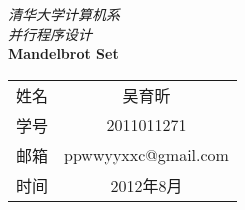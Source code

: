 
\newcommand{\HUGE}{\fontsize{29pt}{29pt}\selectfont} 
\renewcommand{\today}{\number\year 年 \number\month 月 \number\day 日}
\begin{titlepage} 


\phantom{Start!}

\vspace{-1.7cm} 

\begin{flushleft}

\emph{\Large 清华大学计算机系}\\[0.2cm]

\emph{\Large 并行程序设计}\\[4.2cm] 




{ \Huge \bfseries Mandelbrot Set}\\[0.4cm]


\end{flushleft}

  

 

\vfill 

 

\begin{flushright}

{



\newcommand{\pillar}{ {\Huge \phantom{A}} }

\large

\begin{tabular}{lc}

\pillar 姓名 & 吴育昕\\\cline{2-2}

\pillar 学号 & 2011011271\\\cline{2-2}

\pillar 邮箱 & ppwwyyxxc@gmail.com \\\cline{2-2}

\pillar 时间 & 2012年8月 \\\cline{2-2}


\end{tabular}

} 

\end{flushright} 

\end{titlepage} 

